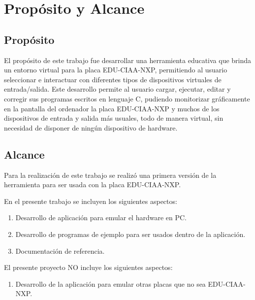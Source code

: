
\section{Propósito y Alcance}

\subsection{Propósito}

El propósito de este trabajo fue desarrollar una herramienta educativa que brinda un entorno virtual para la placa EDU-CIAA-NXP, permitiendo al usuario seleccionar e interactuar con diferentes tipos de dispositivos virtuales de entrada/salida. Este desarrollo permite al usuario cargar,
ejecutar, editar y corregir sus programas escritos en lenguaje C, pudiendo monitorizar gráficamente en la pantalla del ordenador la placa EDU-CIAA-NXP y muchos de los dispositivos de entrada y salida más usuales, todo de manera virtual, sin necesidad de disponer de ningún dispositivo de hardware.

\subsection{Alcance}

Para la realización de este trabajo se realizó una primera versión de la herramienta para ser usada con la placa EDU-CIAA-NXP.

En el presente trabajo se incluyen los siguientes aspectos:

\begin{enumerate}
	\item Desarrollo de aplicación para emular el hardware en PC.
	\item Desarrollo de programas de ejemplo para ser usados dentro de la aplicación.
	\item Documentación de referencia.
\end{enumerate}

El presente proyecto NO incluye los siguientes aspectos:

\begin{enumerate}
	\item Desarrollo de la aplicación para emular otras placas que no sea EDU-CIAA-NXP.
\end{enumerate}